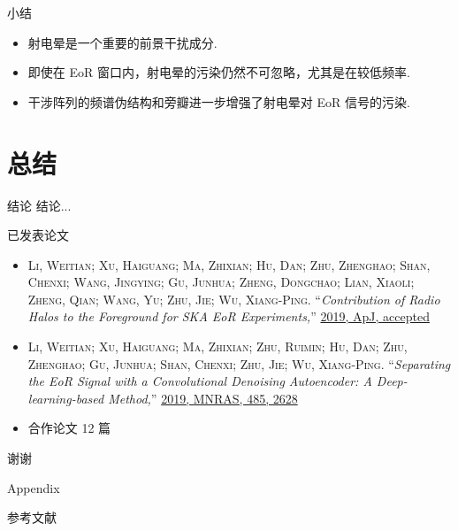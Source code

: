 \documentclass{beamer}
\begin{document}
\begin{frame}{小结}
  \begin{itemize}
    \item 射电晕是一个重要的前景干扰成分.
    \item 即使在 EoR 窗口内，射电晕的污染仍然不可忽略，尤其是在较低频率.
    \item 干涉阵列的频谱伪结构和旁瓣进一步增强了射电晕对 EoR 信号的污染.
  \end{itemize}
\end{frame}


\section{总结}

\begin{frame}{结\cspace{}论}
  结论...
\end{frame}

\begin{frame}{已发表论文}
  \small
  \begin{itemize}
    \item
      \textsc{\alert{Li, Weitian}; Xu, Haiguang; Ma, Zhixian; Hu, Dan;
      Zhu, Zhenghao; Shan, Chenxi; Wang, Jingying; Gu, Junhua;
      Zheng, Dongchao; Lian, Xiaoli; Zheng, Qian; Wang, Yu;
      Zhu, Jie; Wu, Xiang-Ping}.
      \enquote{\it Contribution of Radio Halos to the Foreground for
        SKA EoR Experiments,}
      \href{http://adsabs.harvard.edu/abs/arXiv:1905.05399}{%
        2019, ApJ, accepted}
    \item
      \textsc{\alert{Li, Weitian}; Xu, Haiguang; Ma, Zhixian; Zhu, Ruimin;
      Hu, Dan; Zhu, Zhenghao; Gu, Junhua; Shan, Chenxi; Zhu, Jie;
      Wu, Xiang-Ping}.
      \enquote{\it Separating the EoR Signal with a Convolutional Denoising
        Autoencoder: A Deep-learning-based Method,}
      \href{http://adsabs.harvard.edu/abs/2019MNRAS.485.2628L}{%
        2019, MNRAS, 485, 2628}
    \item
      合作论文 12 篇
  \end{itemize}
\end{frame}

\begin{frame}[standout]
  \Huge 谢\cspace{}谢

\end{frame}


\appendix

\begin{frame}[standout]
  Appendix
\end{frame}

\begin{frame}[allowframebreaks]{参考文献}
  \printbibliography[heading=none]
\end{frame}
\end{document}
